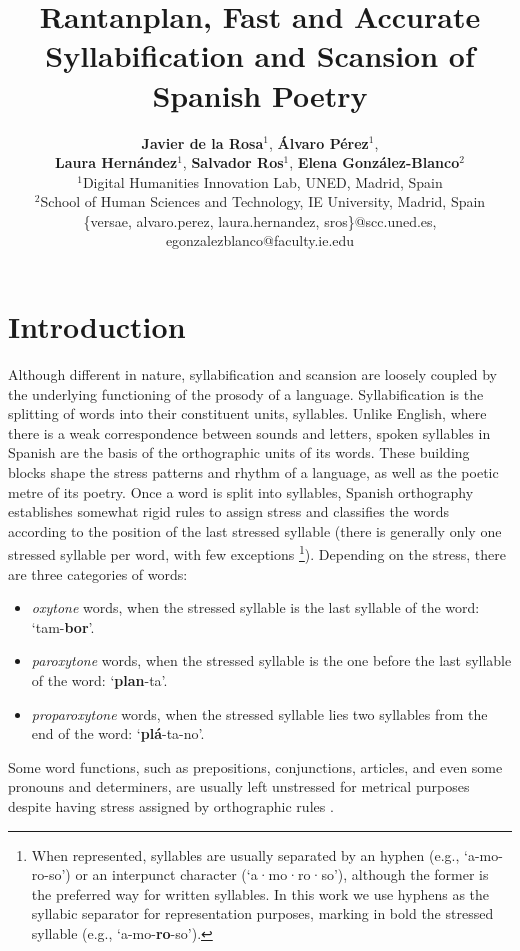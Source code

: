 \documentclass[a4paper,11pt,twocolumn,twoside]{article}
\title{Rantanplan, Fast and Accurate Syllabification and Scansion of Spanish Poetry}
\author {\textbf{Javier de la Rosa$^1$}, \textbf{Álvaro Pérez$^1$}, \\
\textbf{Laura Hernández$^1$}, \textbf{Salvador Ros$^1$}, \textbf{Elena González-Blanco$^2$}\\
$^1$Digital Humanities Innovation Lab, UNED, Madrid, Spain\\
$^2$School of Human Sciences and Technology, IE University, Madrid, Spain\\ \{versae, alvaro.perez, laura.hernandez, sros\}@scc.uned.es,\\
egonzalezblanco@faculty.ie.edu}
\begin{document}

\setlength\titlebox{19cm} %


\label{firstpage} \maketitle

%

\section{Introduction}
Although different in nature, syllabification and scansion are loosely coupled by the underlying functioning of the prosody of a language. Syllabification is the splitting of words into their constituent units, syllables. Unlike English, where there is a weak correspondence between sounds and letters, spoken syllables in Spanish are the basis of the orthographic units of its words. These building blocks shape the stress patterns and rhythm of a language, as well as the poetic metre of its poetry. Once a word is split into syllables, Spanish orthography establishes somewhat rigid rules to assign stress and classifies the words according to the position of the last stressed syllable (there is generally only one stressed syllable per word, with few exceptions \cite{espanola2010ortografia}\footnote{When represented, syllables are usually separated by an hyphen (e.g., `a-mo-ro-so') or an interpunct character (`a·mo·ro·so'), although the former is the preferred way for written syllables. In this work we use hyphens as the syllabic separator for representation purposes, marking in bold the stressed syllable (e.g., `a-mo-\textbf{ro}-so').}). Depending on the stress, there are three categories of words:
\begin{itemize}
\item \textit{oxytone} words, when the stressed syllable is the last syllable of the word: `tam-\textbf{bor}'.
\item \textit{paroxytone} words, when the stressed syllable is the one before the last syllable of the word: `\textbf{plan}-ta'.
\item \textit{proparoxytone} words, when the stressed syllable lies two syllables from the end of the word: `\textbf{plá}-ta-no'.
\end{itemize}
Some word functions, such as prepositions, conjunctions, articles, and even some pronouns and determiners, are usually left unstressed for metrical purposes despite having stress assigned by orthographic rules \cite{caparros1993metrica}.
\end{document}
